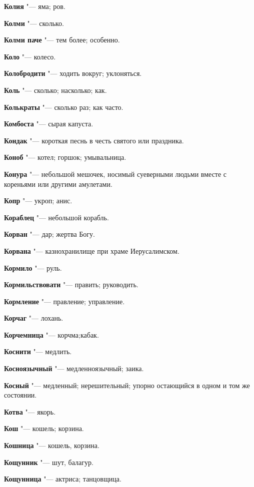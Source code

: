 \begin{mymulticols}
\noindent\textbf{Колия} "--- яма; ров. 

\noindent\textbf{Колми} "--- сколько. 

\noindent\textbf{Колми паче} "--- тем более; особенно. 

\noindent\textbf{Коло} "--- колесо. 

\noindent\textbf{Колобродити} "--- ходить вокруг; уклоняться. 

\noindent\textbf{Коль} "--- сколько; насколько; как. 

\noindent\textbf{Колькраты} "--- сколько раз; как часто. 

\noindent\textbf{Комбоста} "--- сырая капуста. 

\noindent\textbf{Кондак} "--- короткая песнь в честь святого или праздника. 

\noindent\textbf{Коноб} "--- котел; горшок; умывальница. 

\noindent\textbf{Конура} "--- небольшой мешочек, носимый суеверными людьми вместе с кореньями или другими амулетами. 

\noindent\textbf{Копр} "--- укроп; анис. 

\noindent\textbf{Кораблец} "--- небольшой корабль. 

\noindent\textbf{Корван} "--- дар; жертва Богу. 

\noindent\textbf{Корвана} "--- казнохранилище при храме Иерусалимском. 

\noindent\textbf{Кормило} "--- руль. 

\noindent\textbf{Кормильствовати} "--- править; руководить. 

\noindent\textbf{Кормление} "--- правление; управление. 

\noindent\textbf{Корчаг} "--- лохань. 

\noindent\textbf{Корчемница} "--- корчма;кабак. 

\noindent\textbf{Коснити} "--- медлить. 

\noindent\textbf{Косноязычный} "--- медленноязычный; заика. 

\noindent\textbf{Косный} "--- медленный; нерешительный; упорно остающийся в одном и том же состоянии. 

\noindent\textbf{Котва} "--- якорь. 

\noindent\textbf{Кош} "--- кошель; корзина. 

\noindent\textbf{Кошница} "--- кошель, корзина. 

\noindent\textbf{Кощунник} "--- шут, балагур. 

\noindent\textbf{Кощунница} "--- актриса; танцовщица. 


\end{mymulticols}
